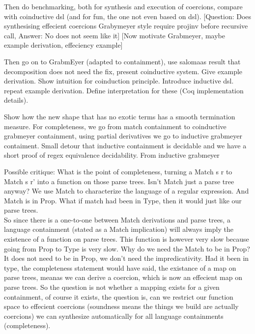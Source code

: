 Then do benchmarking, both for synthesis and execution of coercions, compare with coinductive dsl (and for fun, the one not even based on dsl).
[Question: Does synthesising effecient coercions Grabymeyer style require projinv before recursive call, Answer: No does not seem like it]
[Now motivate Grabmeyer, maybe example derivation, effeciency example]

Then go on to GrabmEyer (adapted to containment), use salomaas result that decomposition does not need the fix, present coinductive system. Give example derivation. Show intuition for coinduction principle. Introduce inductive dsl. repeat example derivation. Define interpretation for these (Coq implementation details). 

Show how the new shape that has no exotic terms has a smooth termination measure. For completeness, we go from match containment to coinductive grabmeyer containment, using partial derivatives we go to inductive grabmeyer contaiment. Small detour that inductive containment is decidable and we have a short proof of regex equivalence decidability. From inductive grabmeyer 

 
Possible critique: What is the point of completeness, turning a Match s r to Match s r' into a function on those parse trees. Isn't Match just a parse tree anyway?
We use Match to characterize the language of a regular expression. And Match is in Prop. What if match had been in Type, then it would just like our parse trees.\\
So since there is a one-to-one between Match derivations and parse trees, a language containment (stated as a Match implication) will always imply the existence of a function on parse trees. This function is however very slow because going from Prop to Type is very slow. Why do we need the Match to be in Prop? It does not need to be in Prop, we don't need the impredicativity. Had it been in type, the completeness statement would have said, the existance of a map on parse trees, meanas we can derive a coercion, which is now an effecient map on parse trees. So the question is not whether a mapping exists for a given containment, of course it exists, the question is, can we restrict our function space to effecient coercions (soundness means the things we build are actually coercions) we can synthesize automatically for all language containments (completeness).

